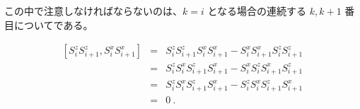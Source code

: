 \documentclass[a4j,11pt]{jreport}
\begin{document}
この中で注意しなければならないのは、$k=i$ となる場合の連続する $k, k+1$ 番目についてである。

\begin{eqnarray}
 \left [
S_{i}^z S_{i+1}^z,
S_{i}^x S_{i+1}^x
 \right ] &=&
S_{i}^z S_{i+1}^z S_{i}^x S_{i+1}^x - S_{i}^x S_{i+1}^x S_{i}^z S_{i+1}^z \nonumber \\
&=&
S_{i}^z S_{i}^x  S_{i+1}^z S_{i+1}^x - S_{i}^x S_{i}^z S_{i+1}^x  S_{i+1}^z \nonumber \\
&=&
S_{i}^z S_{i}^x  S_{i+1}^z S_{i+1}^x - S_{i}^z S_{i}^x  S_{i+1}^z S_{i+1}^x \nonumber \\
&=& 0 \ .
\end{eqnarray}
\end{document}
